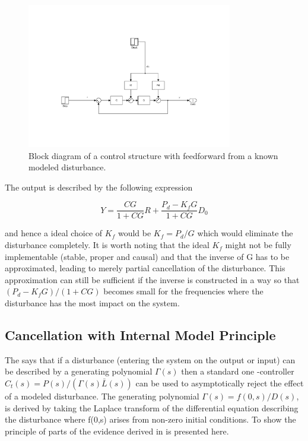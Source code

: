 \begin{figure}[h]
  \centering %
  \includegraphics[width=0.8\textwidth, trim=8cm 4.5cm 5.97cm 8.5cm, clip=true]{fig/matlab/ffdist}
  \caption{\label{fig:ffdist}Block diagram of a control structure with feedforward from a known modeled disturbance.}
\end{figure}

The output is described by the following expression

\begin{equation}
  \label{eq:ffdist}
  Y = \frac{CG}{1+CG}R + \frac{P_d - K_fG}{1+CG}D_0
\end{equation}

and hence a ideal choice of $K_f$ would be $K_f=P_d/G$ which would eliminate the disturbance completely. It is worth noting that the ideal $K_f$ might not be fully implementable (stable, proper and causal) and that the inverse of G has to be approximated, leading to merely partial cancellation of the disturbance. This approximation can still be sufficient if the inverse is constructed in a way so that $(P_d - K_fG)/(1+CG)$ becomes small for the frequencies where the disturbance has the most impact on the system.

\subsection{Cancellation with Internal Model Principle}\label{subsec:distimp}
The \abbrIMP says that if a disturbance (entering the system on the output or input) can be described by a generating polynomial $\Gamma(s)$ then a standard one \abbrDOF-controller $C_{t}(s) = P(s)/(\Gamma(s)\bar{L}(s))$ can be used to asymptotically reject the effect of a modeled disturbance.  The generating polynomial $\Gamma(s) = f(0,s)/D(s)$, is derived by taking the Laplace transform of the differential equation describing the disturbance where f(0,s) arises from non-zero initial conditions. To show the principle of \abbrIMP parts of the evidence derived in \citep{IMP:Perry} is presented here.

